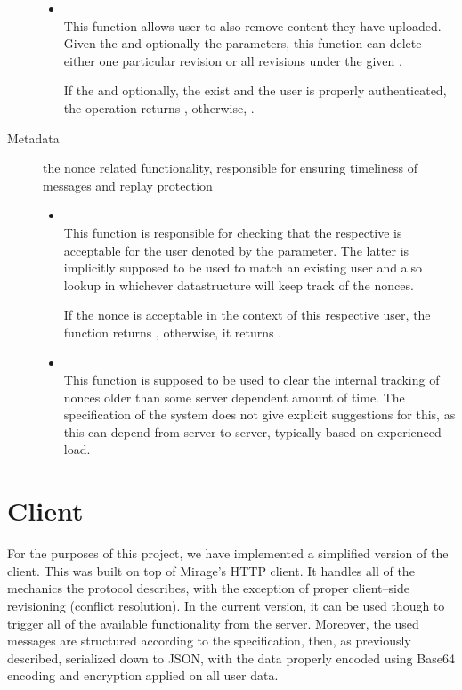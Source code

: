 \begin{description}
\begin{itemize}
  \item {} \\
  This function allows user to also remove content they have uploaded.
  Given the  and optionally the  parameters, this function can delete either one particular revision or all revisions under the given .

  If the  and optionally, the  exist and the user is properly authenticated, the operation returns , otherwise, .

  \end{itemize}
  \item[Metadata] the nonce related functionality, responsible for ensuring timeliness of messages and replay protection
  \begin{itemize}
  \item {} \\
  This function is responsible for checking that the respective  is acceptable for the user denoted by the  parameter.
  The latter is implicitly supposed to be used to match an existing user and also lookup in whichever datastructure will keep track of the nonces.

  If the nonce is acceptable in the context of this respective user, the function returns , otherwise, it returns .

  \item {} \\
  This function is supposed to be used to clear the internal tracking of nonces older than some server dependent amount of time.
  The specification of the system does not give explicit suggestions for this, as this can depend from server to server, typically based on experienced load.
  \end{itemize}
\end{description}

\section{Client}
For the purposes of this project, we have implemented a simplified version of the client.
This was built on top of Mirage's  HTTP client.
It handles all of the mechanics the protocol describes, with the exception of proper client--side revisioning (conflict resolution).
In the current version, it can be used though to trigger all of the available functionality from the server.
Moreover, the used messages are structured according to the specification, then, as previously described, serialized down to JSON, with the data properly encoded using Base64 encoding and encryption applied on all user data.

